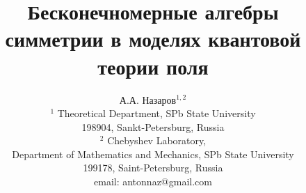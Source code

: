 \documentclass[12pt]{disser}
\theoremstyle{definition}
\begin{document}
\title{Бесконечномерные алгебры симметрии в моделях квантовой теории поля}
\author{А.А. Назаров$^{1,2}$\\
{\small $^1$ Theoretical Department, SPb State University}\\
{\small 198904, Sankt-Petersburg, Russia}\\
{\small$^{2}$ Chebyshev Laboratory,}\\
{\small Department of Mathematics and Mechanics, SPb State University}\\
{\small 199178, Saint-Petersburg, Russia}\\
{\small email: antonnaz@gmail.com}}

\maketitle

\begin{abstract}
\end{abstract}
\end{document}
